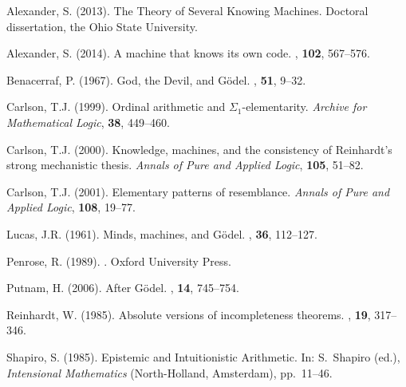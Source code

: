 \documentclass[reqno]{article}
\theoremstyle{definition}
\begin{document}
\begin{thebibliography}{99}

Alexander, S. (2013).
The Theory of Several Knowing Machines.  Doctoral dissertation, the Ohio State University.

Alexander, S. (2014).
\newblock A machine that knows its own code.
, \textbf{102}, 567--576.

Benacerraf, P. (1967).
\newblock God, the Devil, and G\"{o}del.
, \textbf{51}, 9--32.

Carlson, T.J. (1999).  Ordinal arithmetic and $\Sigma_1$-elementarity.
\emph{Archive for Mathematical Logic}, \textbf{38}, 449--460.

Carlson, T.J. (2000). Knowledge, machines, and the consistency of Reinhardt's strong mechanistic thesis.
\hspace{-2pt}\emph{Annals of Pure and Applied Logic}, \textbf{105}, 51--82.

Carlson, T.J. (2001).  Elementary patterns of resemblance.
\emph{Annals of Pure and Applied Logic}, \textbf{108}, 19--77.

Lucas, J.R. (1961).
\newblock Minds, machines, and G\"{o}del.
, \textbf{36}, 112--127.

Penrose, R. (1989).
. Oxford University Press.

Putnam, H. (2006).
\newblock After G\"{o}del.
, \textbf{14}, 745--754.

Reinhardt, W. (1985).
\newblock Absolute versions of incompleteness theorems.
, \textbf{19}, 317--346.

%
%

Shapiro, S. (1985).  Epistemic and Intuitionistic Arithmetic.  In: S.~Shapiro (ed.), \emph{Intensional Mathematics} (North-Holland, Amsterdam),
pp.~11--46.

\end{thebibliography}
\end{document}
